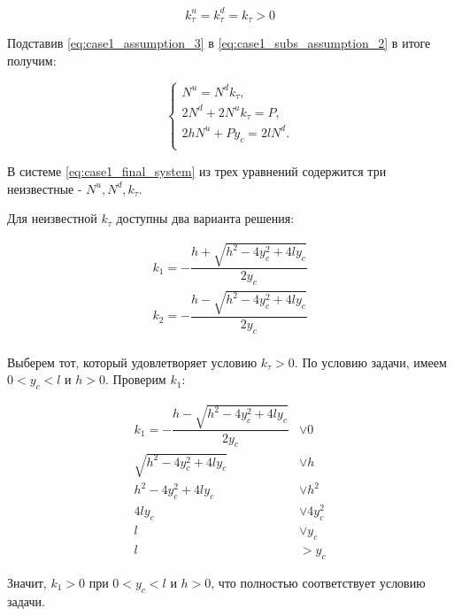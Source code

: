 \begin{equation}
  \label{eq:case1_assumption_3}
  k_\tau^u = k_\tau^d = k_\tau > 0
\end{equation}


Подставив \ref{eq:case1_assumption_3} в \ref{eq:case1_subs_assumption_2} в итоге получим:

\begin{equation}
  \label{eq:case1_final_system}
  \left\{
  \begin{alignedat}{2}
    N^u = N^dk_\tau,\\
    2N^d + 2N^uk_\tau = P,\\
    2hN^u + Py_c = 2lN^d.\\
      \end{alignedat}
  \right.
\end{equation}

В системе \ref{eq:case1_final_system} из трех уравнений содержится три неизвестные - $N^u, N^d, k_\tau$.




Для неизвестной $k_\tau$ доступны два варианта решения:

\begin{equation}
\label{eq:case1_k12}
  \begin{multlined}
    k_1 = -\dfrac{h + \sqrt{h^2 - 4y_c^2 + 4ly_c}}{2y_c} \\
    k_2 = -\dfrac{h - \sqrt{h^2 - 4y_c^2 + 4ly_c}}{2y_c} \\
  \end{multlined}
\end{equation}


Выберем тот, который удовлетворяет условию $k_\tau > 0$. По условию задачи, имеем $0 < y_c < l$ и $h > 0$. Проверим $k_1$:

\[
\begin{alignedat}{3}
  k_1 = - \dfrac{h - \sqrt{h^2 - 4y_c^2+4ly_c}}{2y_c} &\vee 0 \\
  \sqrt{h^2 - 4y_c^2+4ly_c} &\vee h\\
  h^2 - 4y_c^2+4ly_c &\vee h^2 \\
  4ly_c &\vee 4y_c^2 \\
  l &\vee y_c\\
  l &> y_c
\end{alignedat}
\]

Значит, $k_1 > 0$ при $0 < y_c < l$ и $h > 0$, что полностью соответствует условию  задачи.



